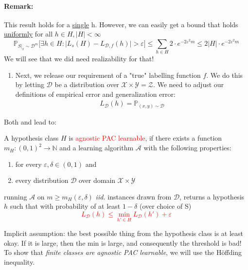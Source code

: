 \documentclass[10pt,a4paper]{article}
\theoremstyle{definition}
\theoremstyle{plain}
\begin{document}
\paragraph{Remark:} This result holds for a \underline{single} h. However, we can easily get a bound that holds \underline{uniformly} for all $h \in H, |H| < \infty$
$$ \mathbb{P}_{S|_x \sim \mathcal{D}^m} \bigg[\exists h \in H: \big|L_{s}(H) - L_{\mathcal{D}, f}(h) \big| > \varepsilon \bigg] \leq \sum_{h \in H} 2\cdot e^{-2 \varepsilon^2 m} \leq 2 \big|H\big| \cdot e^{-2 \varepsilon^2 m} $$ 
We will see that we did need realizability for that!

\begin{enumerate}
	\item[\protect\fbox{2}] Next, we release our requirement of a "true" labelling function $f$. We do this by letting $\mathcal{D}$ be a distribution over $\mathcal{X} \times \mathcal{Y} = \mathcal{Z}$. We need to adjust our definitions of empirical error and generalization error:
	\begin{eqnarray}
		L_{\mathcal{D}}(h) = \mathbb{P}_{(x, y) \sim \mathcal{D}}
	\end{eqnarray}
\end{enumerate}
Both \protect{} and \protect{} lead to:
\begin{boxeddef}
	A hypothesis class $H$ is \textcolor{red}{agnostic PAC learnable}, if there exists a function $m_H: (0,1)^2 \to \mathbb{N}$ and a learning algorithm $\mathcal{A}$ with the following properties:
	\begin{enumerate}
		\item for every $\varepsilon, \delta \in (0,1)$ and
		\item every distribution $\mathcal{D}$ over domain $\mathcal{X} \times \mathcal{Y}$
	\end{enumerate}
	running $\mathcal{A}$ on $m \geq m_H(\varepsilon, \delta)$ \textit{iid.} instances drawn from $\mathcal{D}$, returns a hypothesis $h$ such that with probability of at least $1-\delta$ (over choice of S) 
	\textcolor{red}{$$ 
		L_{\mathcal{D}}(h) \leq \min_{h' \in H} L_{\mathcal{D}}(h') + \varepsilon
		$$}
\end{boxeddef}
Implicit assumption: the best possible thing from the hypothesis class is at least okay. If it is large, then the min is large, and consequently the threshold is bad!\\
To show that \textit{finite classes are agnostic PAC learnable}, we will use the Höffding inequality.
\end{document}

